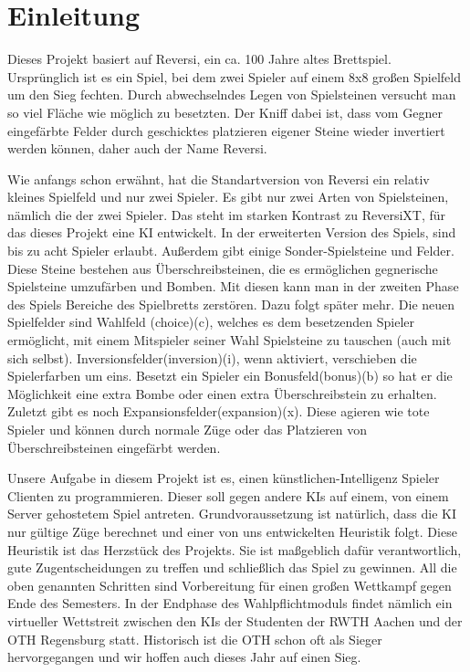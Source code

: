 \documentclass[12pt,a4paper,bibliography=totocnumbered,listof=totocnumbered]{scrartcl}
\begin{document}
\section{Einleitung}


Dieses Projekt basiert auf Reversi, ein ca. 100 Jahre altes Brettspiel. Ursprünglich ist es ein Spiel, bei dem zwei Spieler auf einem 8x8 großen Spielfeld um den Sieg fechten. Durch abwechselndes Legen von Spielsteinen versucht man so viel Fläche wie möglich zu besetzten. Der Kniff dabei ist, dass vom Gegner eingefärbte Felder durch geschicktes platzieren eigener Steine wieder invertiert werden können, daher auch der Name Reversi.

Wie anfangs schon erwähnt, hat die Standartversion von Reversi ein relativ kleines Spielfeld und nur zwei Spieler. Es gibt nur zwei Arten von Spielsteinen, nämlich die der zwei Spieler. Das steht im starken Kontrast zu ReversiXT, für das dieses Projekt eine KI entwickelt. In der erweiterten Version des Spiels, sind bis zu acht Spieler erlaubt. Außerdem gibt einige Sonder-Spielsteine und Felder. Diese Steine bestehen aus \glqq Überschreibsteinen\grqq, die es ermöglichen gegnerische Spielsteine umzufärben und \glqq Bomben\grqq. Mit diesen kann man in der zweiten Phase des Spiels Bereiche des Spielbretts zerstören. Dazu folgt später mehr. Die neuen Spielfelder sind \glqq Wahlfeld\grqq{} (choice)(c), welches es dem besetzenden Spieler ermöglicht, mit einem Mitspieler seiner Wahl Spielsteine zu tauschen (auch mit sich selbst). \glqq Inversionsfelder\grqq (inversion)(i), wenn aktiviert, verschieben die Spielerfarben um eins. Besetzt ein Spieler ein \glqq Bonusfeld\grqq (bonus)(b) so hat er die Möglichkeit eine extra Bombe oder einen extra Überschreibstein zu erhalten. Zuletzt gibt es noch \glqq Expansionsfelder\grqq (expansion)(x). Diese agieren wie \glqq tote\grqq{} Spieler und können durch normale Züge oder das Platzieren von Überschreibsteinen eingefärbt werden.

Unsere Aufgabe in diesem Projekt ist es, einen künstlichen-Intelligenz Spieler Clienten zu programmieren. Dieser soll gegen andere KIs auf einem, von einem Server gehostetem Spiel antreten. Grundvoraussetzung ist natürlich, dass die KI nur gültige Züge berechnet und einer von uns entwickelten Heuristik folgt. Diese Heuristik ist das Herzstück des Projekts. Sie ist maßgeblich dafür verantwortlich, gute Zugentscheidungen zu treffen und schließlich das Spiel zu gewinnen. All die oben genannten Schritten sind Vorbereitung für einen großen Wettkampf gegen Ende des Semesters. In der Endphase des Wahlpflichtmoduls findet nämlich ein virtueller Wettstreit zwischen den KIs der Studenten der RWTH Aachen und der OTH Regensburg statt. Historisch ist die OTH schon oft als Sieger hervorgegangen und wir hoffen auch dieses Jahr auf einen Sieg.
\end{document}
